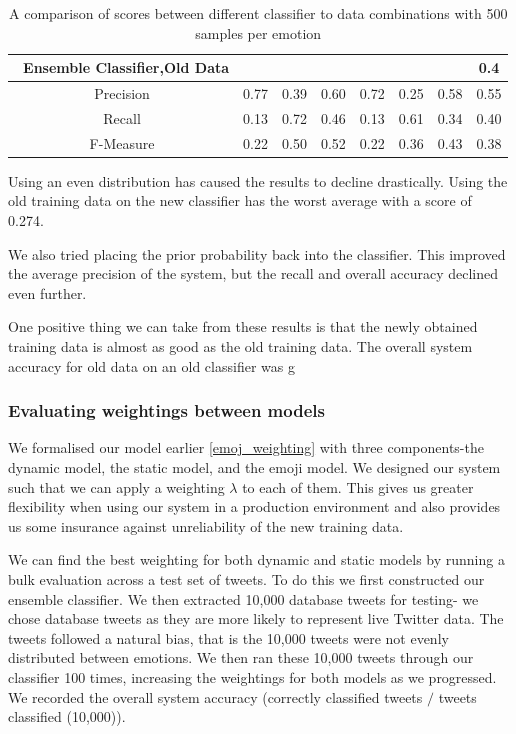 {\begin{table}[H]
{\begin{tabular}{|c|c|c|c|c|c|c|c|}
\ \textbf{Ensemble Classifier,Old Data} & & & & & & & 0.4 \\ 
 \hline
  Precision & 0.77 & 0.39  & 0.60  & 0.72 & 0.25  & 0.58 & 0.55 \\ 
 \hline
 Recall & 0.13  &0.72 & 0.46   & 0.13 &0.61 &0.34 & 0.40 \\
 \hline
 F-Measure & 0.22 & 0.50 &0.52  & 0.22 &0.36 & 0.43 & 0.38 \\
\hline
 
\end{tabular}}
\caption{A comparison of scores between different classifier to data combinations with 500 samples per emotion}
\end{table}

Using an even distribution has caused the results to decline drastically. Using the old training data on the new classifier has the worst average with a score of 0.274.

We also tried placing the prior probability back into the classifier. This improved the average precision of the system, but the recall and overall accuracy declined even further.

One positive thing we can take from these results is that the newly obtained training data is almost as good as the old training data. The overall system accuracy for old data on an old classifier was g


\subsubsection{Evaluating weightings between models} \label{model_eval_lambda}

We formalised our model earlier \ref{emoj_weighting} with three components-the dynamic model, the static model, and the emoji model. We designed our system such that we can apply a weighting $\lambda$ to each of them. This gives us greater flexibility when using our system in a production environment and also provides us some insurance against unreliability of the new training data.

We can find the best weighting for both dynamic and static models by running a bulk evaluation across a test set of tweets. To do this we first constructed our ensemble classifier. We then extracted 10,000 database tweets for testing- we chose database tweets as they are more likely to represent live Twitter data. The tweets followed a natural bias, that is the 10,000 tweets were not evenly distributed between emotions. We then ran these 10,000 tweets through our classifier 100 times, increasing the weightings for both models as we progressed. We recorded the overall system accuracy (correctly classified tweets $/$ tweets classified (10,000)).

}
